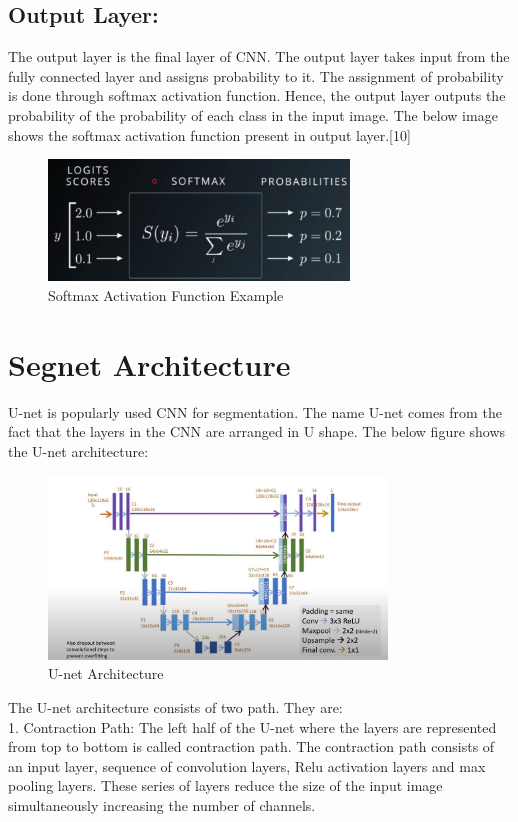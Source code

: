 \documentclass{IEEEtran}
\begin{document}
\subsection{\textbf{Output Layer:}}
The output layer is the final layer of CNN. The output layer takes input from the fully connected layer and assigns probability to it. The assignment of probability is done through softmax activation function. Hence, the output layer outputs the probability of the probability of each class in the input image. The below image shows the softmax activation function present in output layer.[10]

\begin{figure}[h]
    \centering
    \captionsetup{justification=centering}
    \includegraphics[width=8cm]{softmax}
    \caption{Softmax Activation Function Example}
    \label{fig:Softmax Activation Function Example}
\end{figure}
\newpage
\section{\textbf{Segnet Architecture}}
U-net is popularly used CNN for segmentation. The name U-net comes from the fact that the layers in the CNN are arranged in U shape. The below figure shows the U-net architecture:

\begin{figure}[h]
    \centering
    \captionsetup{justification=centering}
    \includegraphics[width=9cm]{u-net}
    \caption{U-net Architecture}
    \label{fig:U-net Architecture}
\end{figure}

The U-net architecture consists of two path. They are:\\
1. Contraction Path: The left half of the U-net where the layers are represented from top to bottom is called contraction path. The contraction path consists of an input layer, sequence of convolution layers, Relu activation layers and max pooling layers. These series of layers reduce the size of the input image simultaneously increasing the number of channels.
\end{document}

